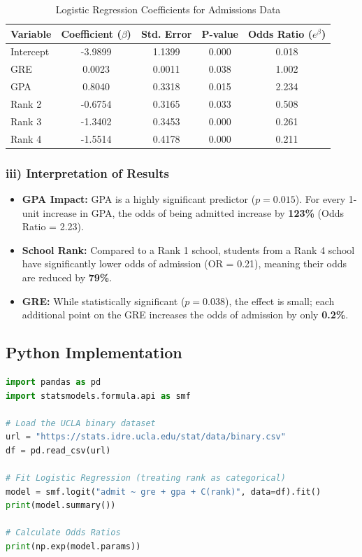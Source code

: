 \documentclass[12pt, a4paper]{article}
\begin{document}
\begin{table}[h!]
\centering
\caption{Logistic Regression Coefficients for Admissions Data}
\begin{tabular}{@{}lcccc@{}}
\toprule
Variable & Coefficient ($\beta$) & Std. Error & P-value & Odds Ratio ($e^\beta$) \\ \midrule
Intercept & -3.9899 & 1.1399 & 0.000 & 0.018 \\
GRE & 0.0023 & 0.0011 & 0.038 & 1.002 \\
GPA & 0.8040 & 0.3318 & 0.015 & 2.234 \\
Rank 2 & -0.6754 & 0.3165 & 0.033 & 0.508 \\
Rank 3 & -1.3402 & 0.3453 & 0.000 & 0.261 \\
Rank 4 & -1.5514 & 0.4178 & 0.000 & 0.211 \\ \bottomrule
\end{tabular}
\end{table}

\subsubsection{iii) Interpretation of Results}
\begin{itemize}
    \item \textbf{GPA Impact:} GPA is a highly significant predictor ($p = 0.015$). For every 1-unit increase in GPA, the odds of being admitted increase by \textbf{123\%} (Odds Ratio = 2.23).
    \item \textbf{School Rank:} Compared to a Rank 1 school, students from a Rank 4 school have significantly lower odds of admission (OR = 0.21), meaning their odds are reduced by \textbf{79\%}.
    \item \textbf{GRE:} While statistically significant ($p = 0.038$), the effect is small; each additional point on the GRE increases the odds of admission by only \textbf{0.2\%}.
\end{itemize}

\subsection{Python Implementation}
\begin{lstlisting}[language=Python]
import pandas as pd
import statsmodels.formula.api as smf

# Load the UCLA binary dataset
url = "https://stats.idre.ucla.edu/stat/data/binary.csv"
df = pd.read_csv(url)

# Fit Logistic Regression (treating rank as categorical)
model = smf.logit("admit ~ gre + gpa + C(rank)", data=df).fit()
print(model.summary())

# Calculate Odds Ratios
print(np.exp(model.params))
\end{lstlisting}
\end{document}
